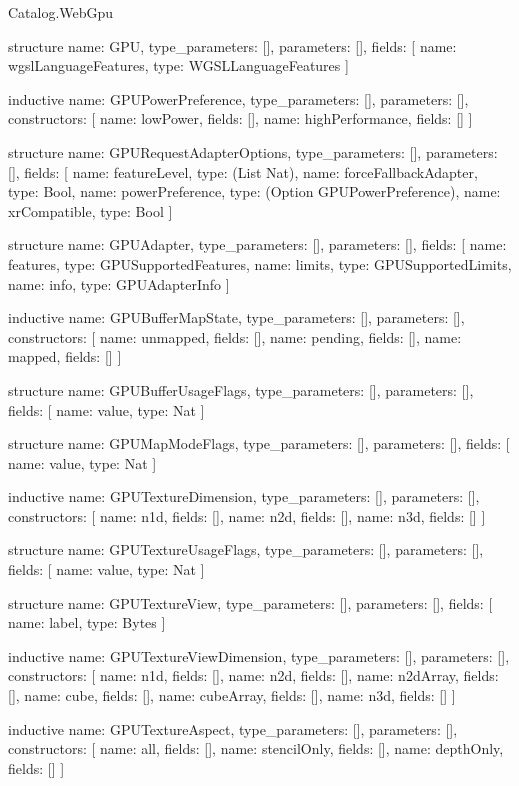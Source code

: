 \begin{lexlean}{Catalog.WebGpu}
\begin{semanticmodule}
structure{
  name: GPU,
  type_parameters: [],
  parameters: [],
  fields: [
    {name: wgslLanguageFeatures, type: WGSLLanguageFeatures}
  ]
}

inductive{
  name: GPUPowerPreference,
  type_parameters: [],
  parameters: [],
  constructors: [
    {name: lowPower, fields: []},
    {name: highPerformance, fields: []}
  ]
}

structure{
  name: GPURequestAdapterOptions,
  type_parameters: [],
  parameters: [],
  fields: [
    {name: featureLevel, type: (List Nat)},
    {name: forceFallbackAdapter, type: Bool},
    {name: powerPreference, type: (Option GPUPowerPreference)},
    {name: xrCompatible, type: Bool}
  ]
}

structure{
  name: GPUAdapter,
  type_parameters: [],
  parameters: [],
  fields: [
    {name: features, type: GPUSupportedFeatures},
    {name: limits, type: GPUSupportedLimits},
    {name: info, type: GPUAdapterInfo}
  ]
}

inductive{
  name: GPUBufferMapState,
  type_parameters: [],
  parameters: [],
  constructors: [
    {name: unmapped, fields: []},
    {name: pending, fields: []},
    {name: mapped, fields: []}
  ]
}

structure{
  name: GPUBufferUsageFlags,
  type_parameters: [],
  parameters: [],
  fields: [
    {name: value, type: Nat}
  ]
}

structure{
  name: GPUMapModeFlags,
  type_parameters: [],
  parameters: [],
  fields: [
    {name: value, type: Nat}
  ]
}

inductive{
  name: GPUTextureDimension,
  type_parameters: [],
  parameters: [],
  constructors: [
    {name: n1d, fields: []},
    {name: n2d, fields: []},
    {name: n3d, fields: []}
  ]
}

structure{
  name: GPUTextureUsageFlags,
  type_parameters: [],
  parameters: [],
  fields: [
    {name: value, type: Nat}
  ]
}

structure{
  name: GPUTextureView,
  type_parameters: [],
  parameters: [],
  fields: [
    {name: label, type: Bytes}
  ]
}

inductive{
  name: GPUTextureViewDimension,
  type_parameters: [],
  parameters: [],
  constructors: [
    {name: n1d, fields: []},
    {name: n2d, fields: []},
    {name: n2dArray, fields: []},
    {name: cube, fields: []},
    {name: cubeArray, fields: []},
    {name: n3d, fields: []}
  ]
}

inductive{
  name: GPUTextureAspect,
  type_parameters: [],
  parameters: [],
  constructors: [
    {name: all, fields: []},
    {name: stencilOnly, fields: []},
    {name: depthOnly, fields: []}
  ]
}


\end{semanticmodule}
\end{lexlean}
